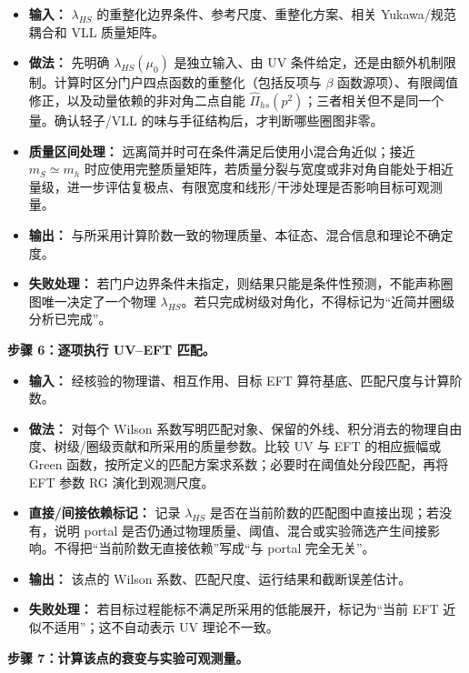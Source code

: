 \documentclass[
  chinese,
  UTF8]{ctexart}
\providecommand{\tightlist}{%
  \setlength{\itemsep}{0pt}\setlength{\parskip}{0pt}}
\begin{document}
\begin{itemize}
\tightlist
\item
  \textbf{输入：} \(\lambda_{HS}\)
  的重整化边界条件、参考尺度、重整化方案、相关 Yukawa/规范耦合和 VLL
  质量矩阵。
\item
  \textbf{做法：} 先明确 \(\lambda_{HS}(\mu_0)\) 是独立输入、由 UV
  条件给定，还是由额外机制限制。计算时区分门户四点函数的重整化（包括反项与
  \(\beta\) 函数源项）、有限阈值修正，以及动量依赖的非对角二点自能
  \(\widehat\Pi_{hs}(p^2)\)；三者相关但不是同一个量。确认轻子/VLL
  的味与手征结构后，才判断哪些圈图非零。
\item
  \textbf{质量区间处理：} 远离简并时可在条件满足后使用小混合角近似；接近
  \(m_S\simeq m_h\)
  时应使用完整质量矩阵，若质量分裂与宽度或非对角自能处于相近量级，进一步评估复极点、有限宽度和线形/干涉处理是否影响目标可观测量。
\item
  \textbf{输出：}
  与所采用计算阶数一致的物理质量、本征态、混合信息和理论不确定度。
\item
  \textbf{失败处理：}
  若门户边界条件未指定，则结果只能是条件性预测，不能声称圈图唯一决定了一个物理
  \(\lambda_{HS}\)。若只完成树级对角化，不得标记为``近简并圈级分析已完成''。
\end{itemize}

\textbf{步骤 6：逐项执行 UV--EFT 匹配。}

\begin{itemize}
\tightlist
\item
  \textbf{输入：} 经核验的物理谱、相互作用、目标 EFT
  算符基底、匹配尺度与计算阶数。
\item
  \textbf{做法：} 对每个 Wilson
  系数写明匹配对象、保留的外线、积分消去的物理自由度、树级/圈级贡献和所采用的质量参数。比较
  UV 与 EFT 的相应振幅或 Green
  函数，按所定义的匹配方案求系数；必要时在阈值处分段匹配，再将 EFT 参数
  RG 演化到观测尺度。
\item
  \textbf{直接/间接依赖标记：} 记录 \(\lambda_{HS}\)
  是否在当前阶数的匹配图中直接出现；若没有，说明 portal
  是否仍通过物理质量、阈值、混合或实验筛选产生间接影响。不得把``当前阶数无直接依赖''写成``与
  portal 完全无关''。
\item
  \textbf{输出：} 该点的 Wilson 系数、匹配尺度、运行结果和截断误差估计。
\item
  \textbf{失败处理：} 若目标过程能标不满足所采用的低能展开，标记为``当前
  EFT 近似不适用''；这不自动表示 UV 理论不一致。
\end{itemize}

\textbf{步骤 7：计算该点的衰变与实验可观测量。}
\end{document}

